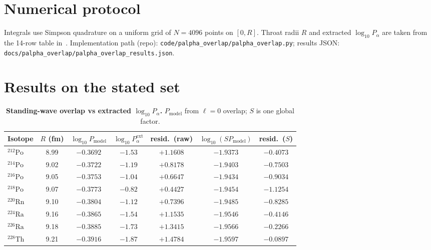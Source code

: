 \documentclass[11pt,a4paper]{article}
\theoremstyle{remark}
\begin{document}
\section{Numerical protocol}

Integrals use Simpson quadrature on a uniform grid of $N=4096$ points on
$[0,R]$.  Throat radii $R$ and extracted $\log_{10} P_\alpha$ are taken from
the 14-row table in~\cite{NuclearDecay2026}.  Implementation path (repo):
\nolinkurl{code/palpha_overlap/palpha_overlap.py}; results JSON:
\nolinkurl{docs/palpha_overlap/palpha_overlap_results.json}.

\section{Results on the stated set}

\begin{table}[H]
\centering
\caption{\textbf{Standing-wave overlap vs extracted $\log_{10} P_\alpha$.}
$P_{\mathrm{model}}$ from $\ell=0$ overlap; $S$ is one global factor.}
\label{tab:overlap}
\vspace{0.2em}
\scriptsize
\renewcommand{\arraystretch}{0.75}
\setlength{\tabcolsep}{5pt}
\begin{adjustbox}{max width=\linewidth}\begin{tabular}{lcccccc}
\toprule
\textbf{Isotope} & \textbf{$R$ (fm)} & \textbf{$\log_{10} P_{\mathrm{model}}$}
 & \textbf{$\log_{10} P_\alpha^{\mathrm{ext}}$}
 & \textbf{resid.\ (raw)}
 & \textbf{$\log_{10}(S P_{\mathrm{model}})$}
 & \textbf{resid.\ ($S$)} \\
\midrule
$^{212}\mathrm{Po}$ & 8.99 & $-0.3692$ & $-1.53$ & $+1.1608$ & $-1.9373$ & $-0.4073$ \\
$^{214}\mathrm{Po}$ & 9.02 & $-0.3722$ & $-1.19$ & $+0.8178$ & $-1.9403$ & $-0.7503$ \\
$^{216}\mathrm{Po}$ & 9.05 & $-0.3753$ & $-1.04$ & $+0.6647$ & $-1.9434$ & $-0.9034$ \\
$^{218}\mathrm{Po}$ & 9.07 & $-0.3773$ & $-0.82$ & $+0.4427$ & $-1.9454$ & $-1.1254$ \\
$^{220}\mathrm{Rn}$ & 9.10 & $-0.3804$ & $-1.12$ & $+0.7396$ & $-1.9485$ & $-0.8285$ \\
$^{224}\mathrm{Ra}$ & 9.16 & $-0.3865$ & $-1.54$ & $+1.1535$ & $-1.9546$ & $-0.4146$ \\
$^{226}\mathrm{Ra}$ & 9.18 & $-0.3885$ & $-1.73$ & $+1.3415$ & $-1.9566$ & $-0.2266$ \\
$^{228}\mathrm{Th}$ & 9.21 & $-0.3916$ & $-1.87$ & $+1.4784$ & $-1.9597$ & $-0.0897$ \\

\end{tabular}
\end{adjustbox}
\end{table}
\end{document}

